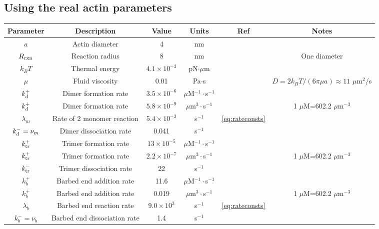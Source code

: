 \documentclass[11pt]{article}
\begin{document}
\subsection{Using the real actin parameters}
\begin{table}
\begin{center}
\begin{tabular}{|c|c|c|c|c|c|}\hline
Parameter & Description & Value & Units & Ref & Notes \\ \hline
$a$ & Actin diameter & 4 & nm & & \\
$R_\text{rxn}$ & Reaction radius & 8 & nm & & One diameter \\
$k_B T$ & Thermal energy & $4.1 \times 10^{-3}$ & pN$\cdot \mu$m & & \\ 
$\mu$ & Fluid viscosity & 0.01 & Pa$\cdot$s & & $D=2k_BT/(6 \pi \mu a)\approx 11$ $\mu$m$^2$/s \\  \hline
$k_d^+$ & Dimer formation rate& $3.5 \times 10^{-6}$ & $\mu$M$^{-1}\cdot$s$^{-1}$ & \cite{rosenbloom2021mechanism} & \\ 
$k_d^+$ & Dimer formation rate& $5.8 \times 10^{-9}$ & $\mu$m$^{3} \cdot$s$^{-1}$ & \cite{rosenbloom2021mechanism} & 1 $\mu$M=602.2 $\mu$m$^{-3}$ \\
$\lambda_m$ & Rate of 2 monomer reaction & $5.4 \times 10^{-3}$& s$^{-1}$ & \eqref{eq:rateconsts} & \\
$k_d^-=\nu_m$ & Dimer dissociation rate & 0.041 & s$^{-1}$ & \cite{rosenbloom2021mechanism} &\\ \hline
$k_\text{tr}^+$ & Trimer formation rate& $13 \times 10^{-5}$ & $\mu$M$^{-1}\cdot$s$^{-1}$ & \cite{rosenbloom2021mechanism} & \\ 
$k_\text{tr}^+$ & Trimer formation rate& $2.2 \times 10^{-7}$ & $\mu$m$^{3} \cdot$s$^{-1}$ & \cite{rosenbloom2021mechanism} & 1 $\mu$M=602.2 $\mu$m$^{-3}$ \\
$k_\text{tr}^-$ & Trimer dissociation rate & 22 & s$^{-1}$ & \cite{rosenbloom2021mechanism} &\\ \hline
$k_b^+$ & Barbed end addition rate& 11.6 & $\mu$M$^{-1}\cdot$s$^{-1}$ & \cite{rosenbloom2021mechanism} & \\ 
$k_b^+$ &  Barbed end addition rate& 0.019 & $\mu$m$^{3} \cdot$s$^{-1}$ & \cite{rosenbloom2021mechanism} & 1 $\mu$M=602.2 $\mu$m$^{-3}$ \\
$\lambda_b$ & Barbed end reaction rate & $9.0 \times 10^{3}$& s$^{-1}$ & \eqref{eq:rateconsts} & \\
$k_b^-=\nu_b$ & Barbed end dissociation rate & 1.4 & s$^{-1}$ & \cite{rosenbloom2021mechanism} &\\ \hline

\end{tabular}
\end{center}
\end{table}
\end{document}
